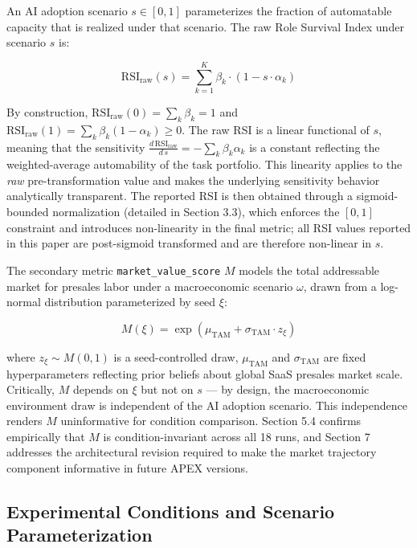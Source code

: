 \documentclass[10pt, conference]{IEEEtran}
\begin{document}
An AI adoption scenario $s \in [0,1]$ parameterizes the fraction of automatable capacity that is realized under that scenario. The raw Role Survival Index under scenario $s$ is:

\begin{equation}
\text{RSI}_{\text{raw}}(s) = \sum_{k=1}^{K} \beta_k \cdot \left(1 - s \cdot \alpha_k\right)
\end{equation}

By construction, $\text{RSI}_{\text{raw}}(0) = \sum_k \beta_k = 1$ and $\text{RSI}_{\text{raw}}(1) = \sum_k \beta_k (1 - \alpha_k) \geq 0$. The raw RSI is a linear functional of $s$, meaning that the sensitivity $\frac{d\,\text{RSI}_{\text{raw}}}{d\,s} = -\sum_k \beta_k \alpha_k$ is a constant reflecting the weighted-average automability of the task portfolio. This linearity applies to the \textit{raw} pre-transformation value and makes the underlying sensitivity behavior analytically transparent. The reported RSI is then obtained through a sigmoid-bounded normalization (detailed in Section 3.3), which enforces the $[0,1]$ constraint and introduces non-linearity in the final metric; all RSI values reported in this paper are post-sigmoid transformed and are therefore non-linear in $s$.

The secondary metric \texttt{market\_value\_score} $M$ models the total addressable market for presales labor under a macroeconomic scenario $\omega$, drawn from a log-normal distribution parameterized by seed $\xi$:

\begin{equation}
M(\xi) = \exp\left(\mu_{\text{TAM}} + \sigma_{\text{TAM}} \cdot z_\xi\right)
\end{equation}

where $z_\xi \sim M(0,1)$ is a seed-controlled draw, $\mu_{\text{TAM}}$ and $\sigma_{\text{TAM}}$ are fixed hyperparameters reflecting prior beliefs about global SaaS presales market scale. Critically, $M$ depends on $\xi$ but not on $s$ --- by design, the macroeconomic environment draw is independent of the AI adoption scenario. This independence renders $M$ uninformative for condition comparison. Section 5.4 confirms empirically that $M$ is condition-invariant across all 18 runs, and Section 7 addresses the architectural revision required to make the market trajectory component informative in future APEX versions.

\subsection{Experimental Conditions and Scenario Parameterization}
\end{document}
